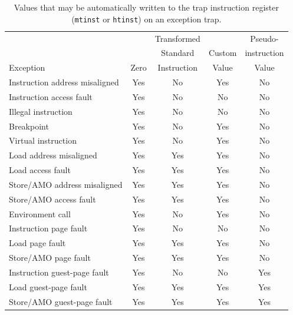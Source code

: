 \begin{table}[h!]
\begin{center}
\begin{tabular}{|l|c|c|c|c|}
\hline
                               &      & Transformed &        & Pseudo- \\
                               &      & Standard    & Custom & instruction \\
Exception                      & Zero & Instruction & Value  & Value \\
\hline
Instruction address misaligned & Yes  & No          & Yes    & No  \\
\hline
Instruction access fault       & Yes  & No          & No     & No  \\
Illegal instruction            & Yes  & No          & No     & No  \\
Breakpoint                     & Yes  & No          & Yes    & No  \\
Virtual instruction            & Yes  & No          & Yes    & No  \\
\hline
Load address misaligned        & Yes  & Yes         & Yes    & No  \\
Load access fault              & Yes  & Yes         & Yes    & No  \\
Store/AMO address misaligned   & Yes  & Yes         & Yes    & No  \\
Store/AMO access fault         & Yes  & Yes         & Yes    & No  \\
\hline
Environment call               & Yes  & No          & Yes    & No  \\
\hline
Instruction page fault         & Yes  & No          & No     & No  \\
Load page fault                & Yes  & Yes         & Yes    & No  \\
Store/AMO page fault           & Yes  & Yes         & Yes    & No  \\
\hline
Instruction guest-page fault   & Yes  & No          & No     & Yes \\
Load guest-page fault          & Yes  & Yes         & Yes    & Yes \\
Store/AMO guest-page fault     & Yes  & Yes         & Yes    & Yes \\
\hline
\end{tabular}
\end{center}
\caption{Values that may be automatically written to the trap instruction
register ({\tt mtinst} or {\tt htinst}) on an exception trap.}
\label{tab:tinst-values}
\end{table}

